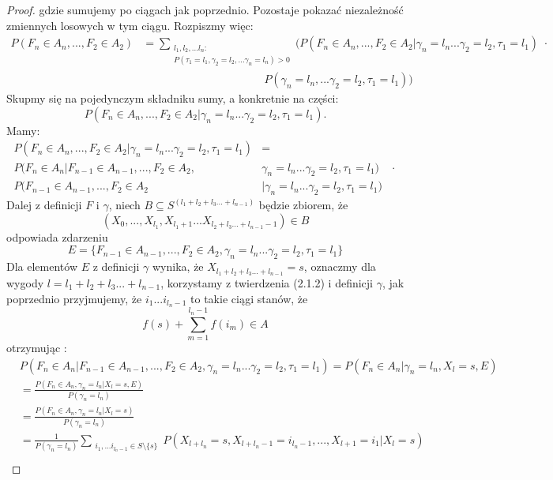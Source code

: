 \documentclass[a4paper]{article}
\theoremstyle{defn}
\theoremstyle{theorem}
\theoremstyle{lemma}
\theoremstyle{cor}
\theoremstyle{fact}
\begin{document}
\begin{proof}
gdzie sumujemy po ciągach jak poprzednio.
Pozostaje pokazać niezależność zmiennych losowych w tym ciągu. Rozpiszmy więc:
\begin{align*}
    P(F_n \in A_n, ..., F_2 \in A_2) &= \sum\limits_{\substack{l_1, l_2, ... l_n:\\P(\tau_1 = l_1, \gamma_2 = l_2, ... \gamma_n = l_n) > 0}}(P(F_n \in A_n, ..., F_2 \in A_2|\gamma_n = l_n ... \gamma_2 = l_2, \tau_1 = l_1)\,\, \cdot \\
    &\quad\quad\quad\quad\quad\quad\quad\quad\quad\quad\quad P(\gamma_n = l_n, ... \gamma_2 = l_2, \tau_1 = l_1))
\end{align*}
Skupmy się na pojedynczym składniku sumy, a konkretnie na części:
$$P(F_n \in A_n, ..., F_2 \in A_2|\gamma_n = l_n ... \gamma_2 = l_2, \tau_1 = l_1).$$
Mamy:
\begin{align*}
    P(F_n \in A_n, ..., F_2 \in A_2 |\gamma_n = l_n ... \gamma_2 = l_2, \tau_1 = l_1) &=\\
    P(F_n \in A_n|F_{n-1} \in A_{n-1},  ..., F_2 \in A_2, &\gamma_n = l_n ... \gamma_2 = l_2, \tau_1 = l_1)\quad \cdot \\
    P(F_{n-1} \in A_{n-1},  ..., F_2 \in A_2 &|\gamma_n = l_n ... \gamma_2 = l_2, \tau_1 = l_1)
\end{align*}
Dalej z definicji $F$ i $\gamma$, niech $B \subseteq S^{(l_1 + l_2 + l_3 ... +l_{n-1})}$ będzie zbiorem, że $$(X_0, ..., X_{l_1}, X_{l_1+1} ... X_{l_2 + l_3 ... + l_{n-1} - 1}) \in B$$
odpowiada zdarzeniu
$$E = \{F_{n-1} \in A_{n-1},  ..., F_2 \in A_2, \gamma_n = l_n ... \gamma_2 = l_2, \tau_1 = l_1\}$$
Dla elementów $E$ z definicji $\gamma$ wynika, że $X_{l_1 + l_2 + l_3 ... + l_{n-1}} = s$, oznaczmy dla wygody $l = l_1 + l_2 + l_3 ... + l_{n-1}$, korzystamy z twierdzenia (2.1.2) i definicji $\gamma$, jak poprzednio przyjmujemy, że $i_1 ... i_{l_n-1}$ to takie ciągi stanów, że $$f(s) + \sum\limits_{m = 1}^{l_n-1} f(i_m) \in A$$
otrzymując :
\begin{align*}
    &P(F_n \in A_n|F_{n-1} \in A_{n-1},  ..., F_2 \in A_2, \gamma_n = l_n ... \gamma_2 = l_2, \tau_1 = l_1) = P(F_n \in A_n|\gamma_n = l_n, X_l = s, E)
\end{align*}
\begin{align*}
    &= \frac{P(F_n \in A_n, \gamma_n = l_n | X_l = s, E)}{P(\gamma_n = l_n)}\\
    &= \frac{P(F_n \in A_n, \gamma_n = l_n | X_l = s)}{P(\gamma_n = l_n)}\\
    &= \frac{1}{P(\gamma_n = l_n)} \sum\limits_{\substack{i_1, ... i_{l_n - 1} \in S\setminus \{s\}}} P(X_{l+l_n} = s, X_{l+l_{n}-1} = i_{l_{n}-1}, ..., X_{l+1} = i_1 | X_l = s)\\

\end{align*}
\end{proof}
\end{document}

